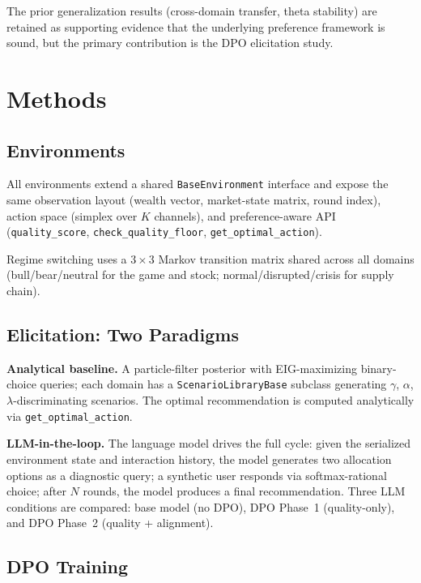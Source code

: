 \documentclass[11pt]{article}
\begin{document}
The prior generalization results (cross-domain transfer, theta stability) are
retained as supporting evidence that the underlying preference framework is
sound, but the primary contribution is the DPO elicitation study.

\section{Methods}

\subsection{Environments}

All environments extend a shared \texttt{BaseEnvironment} interface and expose
the same observation layout (wealth vector, market-state matrix, round index),
action space (simplex over $K$ channels), and preference-aware API
(\texttt{quality\_score}, \texttt{check\_quality\_floor},
\texttt{get\_optimal\_action}).

Regime switching uses a $3 \times 3$ Markov transition matrix shared across
all domains (bull/bear/neutral for the game and stock; normal/disrupted/crisis
for supply chain).

\subsection{Elicitation: Two Paradigms}

\textbf{Analytical baseline.} A particle-filter posterior with EIG-maximizing
binary-choice queries; each domain has a \texttt{ScenarioLibraryBase} subclass
generating $\gamma$, $\alpha$, $\lambda$-discriminating scenarios. The optimal
recommendation is computed analytically via \texttt{get\_optimal\_action}.

\textbf{LLM-in-the-loop.} The language model drives the full cycle: given the
serialized environment state and interaction history, the model generates two
allocation options as a diagnostic query; a synthetic user responds via
softmax-rational choice; after $N$ rounds, the model produces a final
recommendation. Three LLM conditions are compared: base model (no DPO),
DPO Phase~1 (quality-only), and DPO Phase~2 (quality + alignment).

\subsection{DPO Training}
\end{document}
